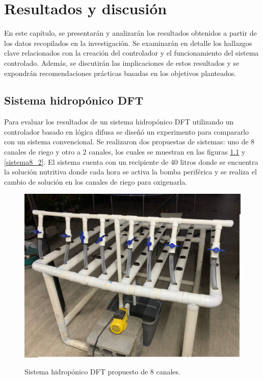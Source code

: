 

\chapter{Resultados y discusión} \label{chap:AyR}
 En este capítulo, se presentarán y analizarán los resultados obtenidos a partir de los datos recopilados en la investigación. Se examinarán en detalle los hallazgos clave relacionados con la creación del controlador y el funcionamiento del sistema controlado. Además, se discutirán las implicaciones de estos resultados y se expondrán recomendaciones prácticas basadas en los objetivos planteados.

 
\section{Sistema hidropónico DFT}
Para evaluar los resultados de un sistema hidropónico DFT utilizando un controlador basado en lógica difusa se diseñó un experimento para compararlo con un sistema convencional. Se realizaron dos propuestas de sistemas: uno de 8 canales de riego y otro a 2 canales, los cuales se muestran en las figuras \ref{sistema8} y \ref{sistema8_2}. El sistema cuenta con un recipiente de 40 litros donde se encuentra la solución nutritiva donde cada hora se activa la bomba periférica y se realiza el cambio de solución en los canales de riego para oxigenarla.

 \begin{figure}[H]
\centering
         \includegraphics[scale=0.33]{imgs/1.png} \\
    \caption{Sistema hidropónico DFT propuesto de 8 canales. }\label{sistema8}
\end{figure}

